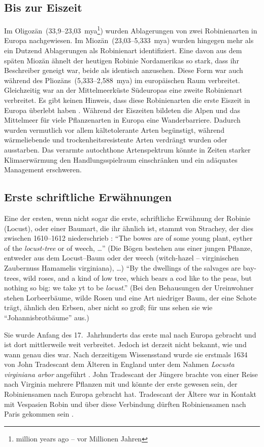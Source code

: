 \documentclass[twocolumn]{scrartcl}
\begin{document}
\subsection{Bis zur Eiszeit}

Im Oligozän~(33,9--23,03~mya\footnote{million years ago -- vor
Millionen Jahren}) wurden Ablagerungen von zwei Robinienarten in
Europa nachgewiesen. Im Miozän~(23,03--5,333~mya) wurden hingegen mehr
als ein Dutzend Ablagerungen als Robinienart identifiziert. Eine davon
aus dem späten Miozän ähnelt der heutigen Robinie Nordamerikas so
stark, dass ihr Beschreiber geneigt war, beide als identisch
anzusehen. Diese Form war auch während des Pliozäns~(5,333--2,588~mya)
im europäischen Raum verbreitet. Gleichzeitig war an der
Mittelmeerküste Südeuropas eine zweite Robinienart verbreitet. Es gibt
keinen Hinweis, dass diese Robinienarten die erste Eiszeit in Europa
überlebt haben \citep{berry1918robinie}. Während der Eiszeiten
bildeten die Alpen und das Mittelmeer für viele Pflanzenarten in
Europa eine Wanderbarriere. Dadurch wurden vermutlich vor allem
kältetolerante Arten begünstigt, während wärmeliebende und
trockenheitsresistente Arten verdrängt wurden oder ausstarben. Das
verarmte autochthone Artenspektrum könnte in Zeiten starker
Klimaerwärmung den Handlungsspielraum einschränken und ein adäquates
Management erschweren.

\subsection{Erste schriftliche Erwähnungen}

Eine der ersten, wenn nicht sogar die erste, schriftliche Erwähnung der Robinie
(Locust), oder einer Baumart, die ihr ähnlich ist, stammt von Strachey, der dies
zwischen 1610--1612 niederschrieb \citep{strachey1610-1612historie}:
\enquote{The bowes are of some young plant, eyther of the \emph{locust-tree} or
of weech, \dots} (Die Bögen bestehen aus einer jungen Pflanze, entweder aus dem
Locust--Baum oder der weech (witch-hazel -- virginischen Zaubernuss Hamamelis
virginiana), \dots) \enquote{By the dwellings of the salvages are bay-trees,
wild roses, and a kind of low tree, which bears a cod like to the peas, but
nothing so big: we take yt to be \emph{locust}.} (Bei den Behausungen der
Ureinwohner stehen Lorbeerbäume, wilde Rosen und eine Art niedriger Baum, der
eine Schote trägt, ähnlich den Erbsen, aber nicht so groß; für uns sehen sie wie
\enquote{Johannisbrotbäume} aus.)

Sie wurde Anfang des 17.~Jahrhunderts das erste mal nach Europa gebracht und ist
dort mittlerweile weit verbreitet. Jedoch ist derzeit nicht bekannt, wie und
wann genau dies war. Nach derzeitigem Wissensstand wurde sie erstmals 1634 von
John Tradescant dem Älteren in England unter dem Nahmen \emph{Locusta virginiana
arbor} angeführt \citep[S.~339]{gunther1922botanists}. John Tradescant der
Jüngere brachte von einer Reise nach Virginia mehrere Pflanzen mit und könnte
der erste gewesen sein, der Robiniensamen nach Europa gebracht hat. Tradescant
der Ältere war in Kontakt mit Vespasien Robin und über diese Verbindung dürften
Robiniensamen nach Paris gekommen sein \citep{bouteiller2019robinie}.
\end{document}
